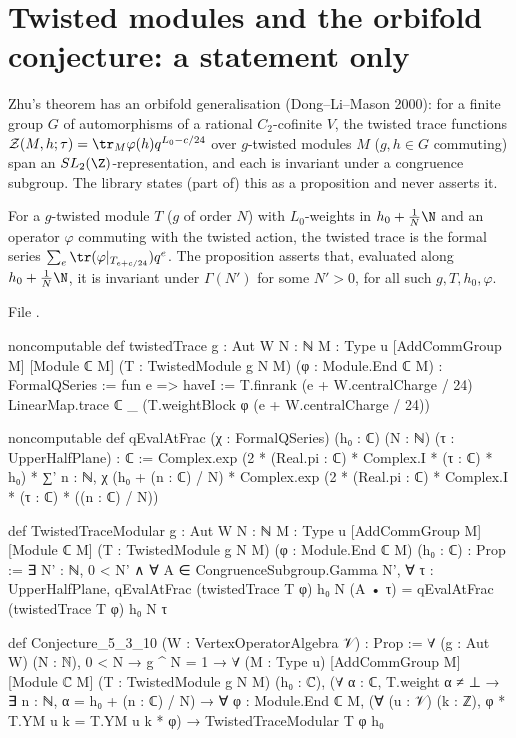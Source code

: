 \section[Twisted modules: a statement only]{Twisted modules and the orbifold conjecture: a statement only}\label{l15:sec:twisted}

Zhu's theorem has an orbifold generalisation (Dong--Li--Mason 2000): for a finite group $G$ of automorphisms of a rational
$C_2$-cofinite $V$, the twisted trace functions $\lfifteenZ(M,h;\tau)=\tr_M\varphi(h)q^{L_0-c/24}$ over $g$-twisted modules $M$
($g,h\in G$ commuting) span an $\lfifteenSL$-representation, and each is invariant under a congruence subgroup. The library
states (part of) this as a proposition and never asserts it.

\begin{definition}\label{l15:def:conj}
For a $g$-twisted module $T$ ($g$ of order $N$) with $L_0$-weights in $h_0+\frac1N\N$ and an operator $\varphi$ commuting with
the twisted action, the twisted trace is the formal series $\sum_e\tr(\varphi|_{T_{e+c/24}})q^e$. The proposition asserts that,
evaluated along $h_0+\frac1N\N$, it is invariant under $\Gamma(N')$ for some $N'>0$, for all such $g,T,h_0,\varphi$.
\end{definition}
\noindent File .
\begin{leancode}
noncomputable def twistedTrace {g : Aut W} {N : ℕ} {M : Type u} [AddCommGroup M] [Module ℂ M]
    (T : TwistedModule g N M) (φ : Module.End ℂ M) : FormalQSeries :=
  fun e =>
    haveI := T.finrank (e + W.centralCharge / 24)
    LinearMap.trace ℂ _ (T.weightBlock φ (e + W.centralCharge / 24))

noncomputable def qEvalAtFrac (χ : FormalQSeries) (h₀ : ℂ) (N : ℕ) (τ : UpperHalfPlane) : ℂ :=
  Complex.exp (2 * (Real.pi : ℂ) * Complex.I * (τ : ℂ) * h₀) *
    ∑' n : ℕ, χ (h₀ + (n : ℂ) / N) * Complex.exp (2 * (Real.pi : ℂ) * Complex.I * (τ : ℂ) * ((n : ℂ) / N))

def TwistedTraceModular {g : Aut W} {N : ℕ} {M : Type u} [AddCommGroup M] [Module ℂ M]
    (T : TwistedModule g N M) (φ : Module.End ℂ M) (h₀ : ℂ) : Prop :=
  ∃ N' : ℕ, 0 < N' ∧ ∀ A ∈ CongruenceSubgroup.Gamma N', ∀ τ : UpperHalfPlane,
    qEvalAtFrac (twistedTrace T φ) h₀ N (A • τ) = qEvalAtFrac (twistedTrace T φ) h₀ N τ

def Conjecture_5_3_10 (W : VertexOperatorAlgebra 𝒱) : Prop :=
  ∀ (g : Aut W) (N : ℕ), 0 < N → g ^ N = 1 →
    ∀ (M : Type u) [AddCommGroup M] [Module ℂ M] (T : TwistedModule g N M) (h₀ : ℂ),
      (∀ α : ℂ, T.weight α ≠ ⊥ → ∃ n : ℕ, α = h₀ + (n : ℂ) / N) →
      ∀ φ : Module.End ℂ M, (∀ (u : 𝒱) (k : ℤ), φ * T.YM u k = T.YM u k * φ) →
        TwistedTraceModular T φ h₀
\end{leancode}

